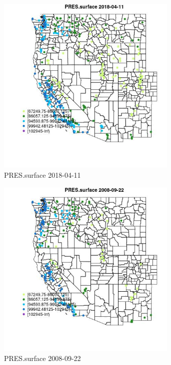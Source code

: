 \begin{figure} 
\centering  
\includegraphics[width=0.77\textwidth]{Code_Outputs/Report_ML_input_PM25_Step4_part_e_de_duplicated_aves_compiled_2019-05-18wNAs_MapObsPRESsurface2018-04-11.jpg} 
\caption{\label{fig:Report_ML_input_PM25_Step4_part_e_de_duplicated_aves_compiled_2019-05-18wNAsMapObsPRESsurface2018-04-11}PRES.surface 2018-04-11} 
\end{figure} 
 

\clearpage 

\begin{figure} 
\centering  
\includegraphics[width=0.77\textwidth]{Code_Outputs/Report_ML_input_PM25_Step4_part_e_de_duplicated_aves_compiled_2019-05-18wNAs_MapObsPRESsurface2008-09-22.jpg} 
\caption{\label{fig:Report_ML_input_PM25_Step4_part_e_de_duplicated_aves_compiled_2019-05-18wNAsMapObsPRESsurface2008-09-22}PRES.surface 2008-09-22} 
\end{figure} 
 

